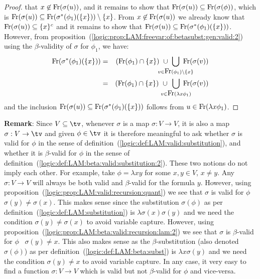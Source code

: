 \begin{proof}
    that $x\not\in\mbox{\rm Fr}(\sigma(u))$, and it remains to show that 
    $\mbox{\rm Fr}(\sigma(u))\subseteq\mbox{\rm Fr}(\sigma(\phi))$, which is
    $\mbox{\rm Fr}(\sigma(u))\subseteq\mbox{\rm Fr}(\sigma^{*}(\phi_{1})(\{x\}))\setminus\{x\}$.
    From $x\not\in\mbox{\rm Fr}(\sigma(u))$ we already know that 
    $\mbox{\rm Fr}(\sigma(u))\subseteq\{x\}^{c}$ and it remains to show that
    $\mbox{\rm Fr}(\sigma(u))\subseteq\mbox{\rm Fr}(\sigma^{*}(\phi_{1})(\{x\}))$. However, from 
    proposition~(\ref{logic:prop:LAM:freevar:of:betasubst:gen:valid:2}) using the 
    $\beta$-validity of $\sigma$ for $\phi_{1}$, we have:
    \begin{eqnarray*}
        \free(\sigma^{*}(\phi_{1})(\{x\}))
        &=&(\free(\phi_{1})\cap\{x\})
        \ \cup\ 
        \!\!\!\!\!\!\!\!\!\!\!\!
        \bigcup_{v\in\free(\phi_{1})\setminus\{x\}} 
        \!\!\!\!\!\!\!\!\!\!
        \free(\sigma(v))\\
        &=&(\free(\phi_{1})\cap\{x\})
        \ \cup\ 
        \!\!\!\!\!\!\!\!\!
        \bigcup_{v\in\free(\lambda x\phi_{1})} 
        \!\!\!\!\!\!\!\!
        \free(\sigma(v))
    \end{eqnarray*}
    and the inclusion 
    $\mbox{\rm Fr}(\sigma(u))\subseteq\mbox{\rm Fr}(\sigma^{*}(\phi_{1})(\{x\}))$
    follows from $u\in\mbox{\rm Fr}(\lambda x\phi_{1})$.
\end{proof}
{\bf Remark}: Since $V\subseteq\tv$, whenever $\sigma$ is a map 
$\sigma:V\to V$, it is also a map $\sigma:V\to\tv$ and given $\phi\in\tv$
it is therefore meaningful to ask whether $\sigma$ is valid for $\phi$ 
in the sense of definition~(\ref{logic:def:LAM:valid:substitution}), 
and whether it is $\beta$-valid for $\phi$ in the sense of 
definition~(\ref{logic:def:LAM:beta:valid:substitution:2}). These two
notions do not imply each other. For example, take $\phi=\lambda x y$
for some $x,y\in V$, $x\neq y$. Any $\sigma:V\to V$ will always be
both valid and $\beta$-valid for the formula $y$. However, using
proposition~(\ref{logic:prop:LAM:valid:recursion:quant}) we see that
$\sigma$ is valid for $\phi$ \ifand\ $\sigma(y)\neq\sigma(x)$. This makes
sense since the substitution $\sigma(\phi)$ as per 
definition~(\ref{logic:def:LAM:substitution}) is $\lambda\sigma(x)\sigma(y)$
and we need the condition $\sigma(y)\neq\sigma(x)$ to avoid variable
capture. However, using 
proposition~(\ref{logic:prop:LAM:beta:valid:recursion:lam:2}) we see that 
$\sigma$ is $\beta$-valid for $\phi$ \ifand\ $\sigma(y)\neq x$.
This also makes sense as the $\beta$-substitution (also denoted $\sigma(\phi)$)
as per definition~(\ref{logic:def:LAM:beta:subst}) is $\lambda x \sigma(y)$
and we need the condition $\sigma(y)\neq x$ to avoid variable capture. In any
case, it very easy to find a function $\sigma:V\to V$ which is valid but not 
$\beta$-valid for $\phi$ and vice-versa.

